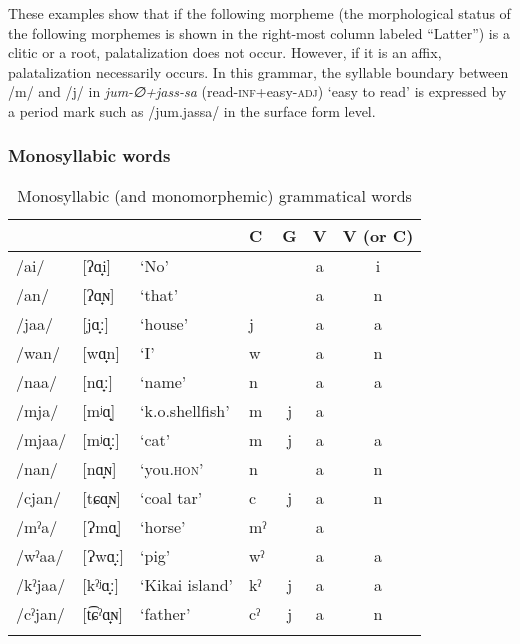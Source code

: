 These examples show that if the following morpheme (the morphological status of the following morphemes is shown in the right-most column labeled “Latter”) is a clitic or a root, palatalization does not occur. However, if it is an affix, palatalization necessarily occurs. In this grammar, the syllable boundary between /m/ and /j/ in \textit{jum-∅+jass-sa} (read-\textsc{inf}+easy-\textsc{adj}) ‘easy to read’ is expressed by a period mark such as /jum.jassa/ in the surface form level.

\subsubsection{Monosyllabic words}
\begin{table}
\caption{Monosyllabic (and monomorphemic) grammatical words}
\begin{tabular}{l@{ }l@{ }llccc} 
\lsptoprule
                 & &   & C  & G &  V  &  V (or C)\\\midrule
/ai/ & [ʔɑ̟i] & ‘No’    &    &   &   a  & i\\
/an/ & [ʔɑ̟ɴ] & ‘that’  &    &   & a   & n\\
/jaa/ & [jɑ̟ː] & ‘house’  & j &  &  a &  a\\
/wan/ & [wɑ̟n] & ‘I’  & w  & &  a &  n\\
/naa/ & [nɑ̟ː] & ‘name’  & n  & &  a &  a\\
/mja/ & [mʲɑ̟] & ‘k.o.shellfish’  & m &  j &  a  \\
/mjaa/ & [mʲɑ̟ː] & ‘cat’ &  m &  j &  a &  a\\
/nan/ & [nɑ̟ɴ] & ‘you.\textsc{hon}’  & n  &  &  a &  n\\
/cjan/ & [tɕɑ̟ɴ] & ‘coal tar’  & c  & j  & a &  n\\
/mˀa/ & [Ɂmɑ̟] & ‘horse’  & mˀ  & &  a & \\
/wˀaa/ & [Ɂwɑ̟ː] & ‘pig’  & wˀ &  &  a &  a\\
/kˀjaa/ & [kˀʲɑ̟ː] & ‘Kikai island’ &  kˀ &  j &  a &  a\\
/cˀjan/ & [t͡ɕˀɑ̟ɴ] & ‘father’  & cˀ &  j &  a &  n\\
\lspbottomrule
\end{tabular}
\end{table}

